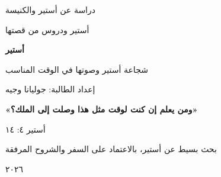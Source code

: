\documentclass[12pt,a4paper]{article}
\begin{document}
\thispagestyle{empty}
\vspace*{1.6cm}
\begin{center}
{\large\color{muted} دراسة عن أستير والكنيسة}\par\vspace{2.4cm}
{\large أستير ودروس من قصتها}\par\vspace{0.8cm}
{\Huge\bfseries\color{teal} أستير}\par\vspace{0.5cm}
{\Large شجاعة أستير وصوتها في الوقت المناسب}\par\vspace{0.6cm}
{\large\color{muted} إعداد الطالبة: جوليانا وجيه}\par\vspace{1.1cm}
{\large\color{teal}\bfseries «ومن يعلم إن كنت لوقت مثل هذا وصلت إلى الملك؟»}\par
أستير ٤: ١٤\par\vfill
بحث بسيط عن أستير، بالاعتماد على السفر والشروح المرفقة\par ٢٠٢٦
\end{center}
\clearpage
\clearpage
\end{document}
